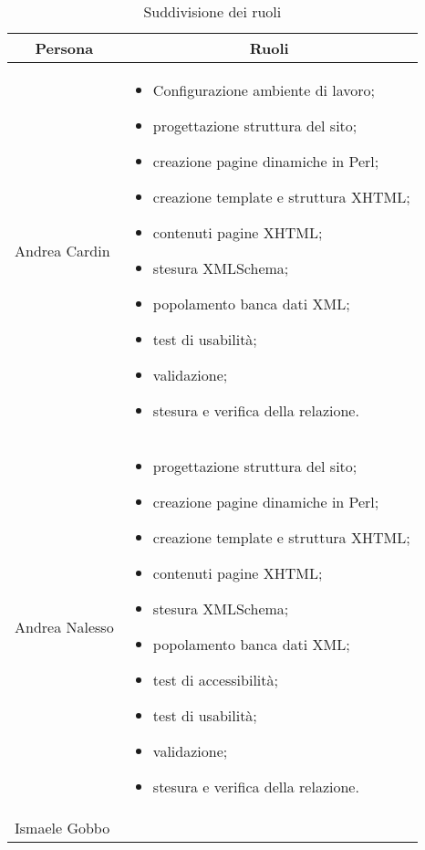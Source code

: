 \begin{table}[H]
	\centering
	\caption{Suddivisione dei ruoli}
	\begin{tabular}{|l|p{}|}
		\hline
		\multicolumn{1}{|c|}{\textbf{Persona}} & \multicolumn{1}{c|}{\textbf{Ruoli}}                   \\ \hline
\multicolumn{1}{|l|}{\rule{0pt}{4ex} Andrea Cardin}  & \multicolumn{1}{p{0.55\textwidth}|}{ \begin{itemize}
			\setlength{\itemsep}{0pt}
			\setlength{\parskip}{0pt}
			\setlength{\parsep}{0pt} 
			\item Configurazione ambiente di lavoro;
			\item progettazione struttura del sito;
			\item creazione pagine dinamiche in Perl;
			\item creazione template e struttura XHTML;
			\item contenuti pagine XHTML;
			\item stesura XMLSchema;
			\item popolamento banca dati XML;
			\item test di usabilità;
			\item validazione;
			\item stesura e verifica della relazione.
		\end{itemize} } \\ \hline
\multicolumn{1}{|l|}{\rule{0pt}{4ex} Andrea Nalesso} & \multicolumn{1}{p{0.55\textwidth}|}{
	\begin{itemize}
		\setlength{\itemsep}{0pt}
		\setlength{\parskip}{0pt}
		\setlength{\parsep}{0pt} 
		\item progettazione struttura del sito;
		\item creazione pagine dinamiche in Perl;
		\item creazione template e struttura XHTML;
		\item contenuti pagine XHTML;
		\item stesura XMLSchema;
		\item popolamento banca dati XML;
		\item test di accessibilità;
		\item test di usabilità;
		\item validazione;
		\item stesura e verifica della relazione.
	\end{itemize}} \\ \hline
	\multicolumn{1}{|l|}{\rule{0pt}{4ex} Ismaele Gobbo}  & \multicolumn{1}{p{0.55\textwidth}|}{\begin{itemize}

\end{itemize}}
\end{tabular}
\end{table}
